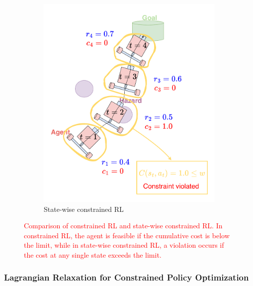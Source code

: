 \begin{figure}[H]
\begin{subfigure}{0.48\textwidth}
        \includegraphics[width=\linewidth]{figure/statewise-constrained-rl.pdf}
        \caption{State-wise constrained RL}
    \end{subfigure}
    \caption{\textcolor{red}{Comparison of constrained RL and state-wise constrained RL. 
            In constrained RL, the agent is feasible if the cumulative cost is below the limit, 
            while in state-wise constrained RL, a violation occurs if the cost at any single state exceeds the limit.}}
\end{figure}



\subsubsection{Lagrangian Relaxation for Constrained Policy Optimization} \label{subsubsec:lagrangian_relaxation}

